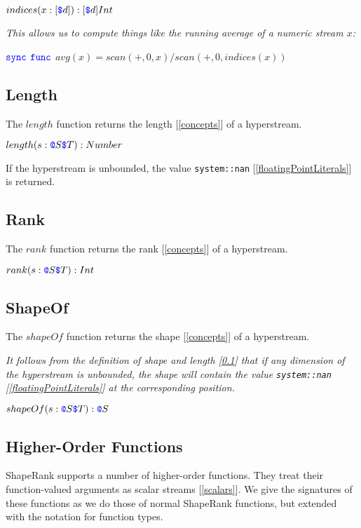 \documentclass{article}
\begin{document}
$indices(x: [\texttt{\color{blue} \$}{}d]): [\texttt{\color{blue} \$}{}d] Int$

{\em
This allows us to compute things like the running average of a numeric stream $x$:

$\texttt{\color{blue} sync}{}$  $\texttt{\color{blue} func}{}$ $avg(x) = scan(+, 0, x)/scan(+, 0, indices(x))$
}

\subsection{Length}
\label{length}

The $length$ function returns the length [\ref{concepts}] of a hyperstream.

$length(s: \texttt{\color{blue} @}{} S \texttt{\color{blue} \$}{} T): Number$

If the hyperstream is unbounded, the value {\tt system::nan} [\ref{floatingPointLiterals}] is returned.

\subsection{Rank}
\label{rank}

The $rank$ function returns the rank [\ref{concepts}] of a hyperstream.

$rank(s: \texttt{\color{blue} @}{} S \texttt{\color{blue} \$}{} T): Int$

\subsection{ShapeOf}
\label{shapeOf}

The $shapeOf$ function returns the shape [\ref{concepts}] of a hyperstream.

{\em 
It follows from the  definition of shape and length [\ref{length}] that
if any  dimension of the hyperstream is unbounded, the shape will contain the value {\tt system::nan} [\ref{floatingPointLiterals}] at the corresponding  position.
}

$shapeOf(s: \texttt{\color{blue} @}{} S \texttt{\color{blue} \$}{} T): \texttt{\color{blue} @}{} S$

\subsection{Higher-Order Functions}
\label{higherOrderFunctions}

ShapeRank supports a number of higher-order functions. They treat their function-valued arguments as scalar streams [\ref{scalars}]. We give the signatures of these functions as we do those of normal ShapeRank functions, but extended with the notation for function types.
\end{document}
